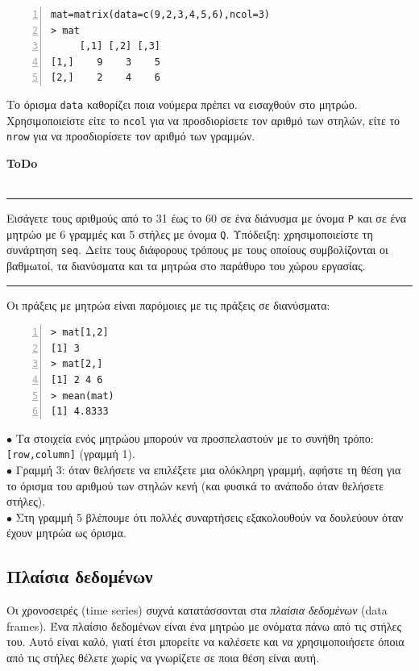 \documentclass[a4paper,10pt,twocolumn]{article}
\newenvironment{ToDo} {
  \begin{flushright}
    \hfill
    \begin{minipage}{0.9\columnwidth}
    \textsf{\textbf{ToDo}} \\
      \vspace{-0.7cm}\\
      {\color{Gray}\rule[-0.05cm]{\columnwidth}{1.5pt}}} {
      {\color{Gray}\rule[0.3cm]{\columnwidth}{1.5pt}}
    \end{minipage}
    \vspace{0.3cm}
  \end{flushright}
  }
\begin{document}
\begin{Verbatim}[frame=single,numbers=left,gobble=0, xleftmargin=0.35cm, numbersep=0.1cm]
mat=matrix(data=c(9,2,3,4,5,6),ncol=3)
> mat
     [,1] [,2] [,3]
[1,]    9    3    5
[2,]    2    4    6
\end{Verbatim}

Το όρισμα \texttt{data} καθορίζει ποια νούμερα πρέπει να εισαχθούν στο μητρώο. Χρησιμοποιείστε είτε το 
\texttt{ncol} για να προσδιορίσετε τον αριθμό των στηλών, είτε το \texttt{nrow} για να προσδιορίσετε τον
αριθμό των γραμμών. 

\begin{ToDo}
Εισάγετε τους αριθμούς από το 31 έως το 60 σε ένα διάνυσμα με όνομα \texttt{P} και σε ένα μητρώο με 6 γραμμές
και 5 στήλες με όνομα \texttt{Q}. Υπόδειξη: χρησιμοποιείστε τη συνάρτηση \texttt{seq}. Δείτε τους διάφορους
τρόπους με τους οποίους συμβολίζονται οι βαθμωτοί, τα διανύσματα και τα μητρώα στο παράθυρο του χώρου 
εργασίας.\\
\end{ToDo}
 
Οι πράξεις με μητρώα είναι παρόμοιες με τις πράξεις σε διανύσματα:

\begin{Verbatim}[frame=single,numbers=left,gobble=0, xleftmargin=0.35cm, numbersep=0.1cm]
> mat[1,2]
[1] 3
> mat[2,]
[1] 2 4 6
> mean(mat)
[1] 4.8333
\end{Verbatim}

\noindent $\bullet$ Τα στοιχεία ενός μητρώου μπορούν να προσπελαστούν με το συνήθη τρόπο: \texttt{[row,column]}
(γραμμή 1). \\
\noindent $\bullet$ Γραμμή 3: όταν θελήσετε να επιλέξετε μια ολόκληρη γραμμή, αφήστε τη θέση για το όρισμα του
αριθμού των στηλών κενή (και φυσικά το ανάποδο όταν θελήσετε στήλες).\\
\noindent $\bullet$ Στη γραμμή 5 βλέπουμε ότι πολλές συναρτήσεις εξακολουθούν να δουλεύουν όταν έχουν μητρώα
ως όρισμα.\\

\subsection{Πλαίσια δεδομένων}

Οι χρονοσειρές (time series) συχνά κατατάσσονται στα \emph{πλαίσια δεδομένων} (data frames). Ένα πλαίσιο
δεδομένων είναι ένα μητρώο με ονόματα πάνω από τις στήλες του. Αυτό είναι καλό, γιατί έτσι μπορείτε να καλέσετε
και να χρησιμοποιήσετε όποια από τις στήλες θέλετε χωρίς να γνωρίζετε σε ποια θέση είναι αυτή.
\end{document}
